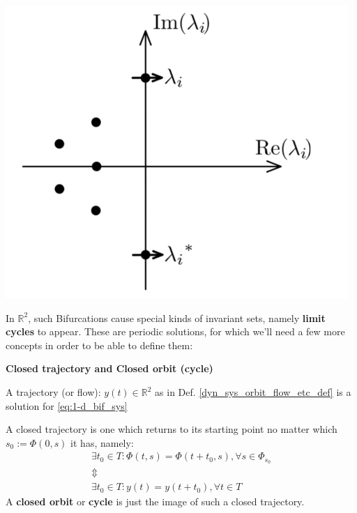 \includegraphics[width=13cm]{math_pics/hopf-bif-eigenvalue-graph.png}

In $\mathbb{R}^2$, such Bifurcations cause special kinds of invariant sets, namely \textbf{limit cycles} to appear. These are periodic solutions, for which we'll need a few more concepts in order to be able to define them:
\begin{definition} \textbf{Closed trajectory and Closed orbit (cycle)}

  A trajectory (or flow): $y(t) \in \mathbb{R}^2$ as in Def. \ref{dyn_sys_orbit_flow_etc_def} is a solution for \ref{eq:1-d_bif_sys}

  A closed trajectory is one which returns to its starting point no matter which $ s_0 := \Phi(0,s) $ it has, namely:
  \begin{gather*}
    \exists t_0 \in T : \Phi(t,s) = \Phi(t+t_0,s), \forall s \in \Phi_{s_0}     \\
    \Updownarrow \\
    \exists t_0 \in T : y(t) = y(t+t_0), \forall t \in T
  \end{gather*}
  A \textbf{closed orbit} or \textbf{cycle} is just the image of such a closed trajectory.
\end{definition}

